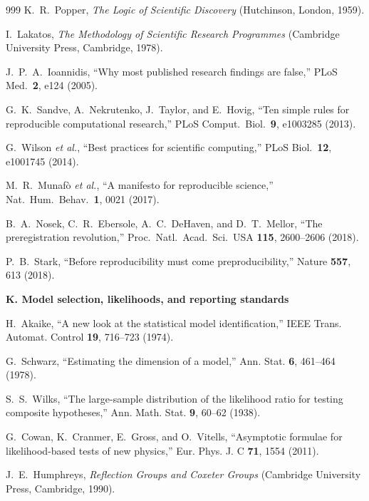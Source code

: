 \begin{thebibliography}{999}
K.~R.~Popper,
\emph{The Logic of Scientific Discovery}
(Hutchinson, London, 1959).

I.~Lakatos,
\emph{The Methodology of Scientific Research Programmes}
(Cambridge University Press, Cambridge, 1978).

J.~P.~A.~Ioannidis,
``Why most published research findings are false,''
PLoS Med.\ \textbf{2}, e124 (2005).

G.~K.~Sandve, A.~Nekrutenko, J.~Taylor, and E.~Hovig,
``Ten simple rules for reproducible computational research,''
PLoS Comput.\ Biol.\ \textbf{9}, e1003285 (2013).

G.~Wilson \emph{et al.},
``Best practices for scientific computing,''
PLoS Biol.\ \textbf{12}, e1001745 (2014).

M.~R.~Munaf\`o \emph{et al.},
``A manifesto for reproducible science,''
Nat.\ Hum.\ Behav.\ \textbf{1}, 0021 (2017).

B.~A.~Nosek, C.~R.~Ebersole, A.~C.~DeHaven, and D.~T.~Mellor,
``The preregistration revolution,''
Proc.\ Natl.\ Acad.\ Sci.\ USA \textbf{115}, 2600--2606 (2018).

P.~B.~Stark,
``Before reproducibility must come preproducibility,''
Nature \textbf{557}, 613 (2018).



\item[]\textbf{K. Model selection, likelihoods, and reporting standards}

H.~Akaike,
``A new look at the statistical model identification,''
IEEE Trans. Automat. Control \textbf{19}, 716--723 (1974).

G.~Schwarz,
``Estimating the dimension of a model,''
Ann. Stat. \textbf{6}, 461--464 (1978).

S.~S.~Wilks,
``The large-sample distribution of the likelihood ratio for testing composite
hypotheses,'' Ann. Math. Stat. \textbf{9}, 60--62 (1938).

G.~Cowan, K.~Cranmer, E.~Gross, and O.~Vitells,
``Asymptotic formulae for likelihood-based tests of new physics,''
Eur. Phys. J. C \textbf{71}, 1554 (2011).

J.~E.~Humphreys,
\emph{Reflection Groups and Coxeter Groups}
(Cambridge University Press, Cambridge, 1990).

\end{thebibliography}



